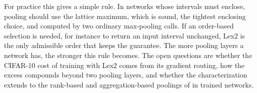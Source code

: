 For practice this gives a simple rule. In networks whose intervals must enclose, pooling should use the lattice maximum, which is sound, the tightest enclosing choice, and computed by two ordinary max-pooling calls. If an order-based selection is needed, for instance to return an input interval unchanged, Lex2 is the only admissible order that keeps the guarantee. The more pooling layers a network has, the stronger this rule becomes. The open questions are whether the CIFAR-10 cost of training with Lex2 comes from its gradient routing, how the excess compounds beyond two pooling layers, and whether the characterization extends to the rank-based and aggregation-based poolings of  in trained networks.





